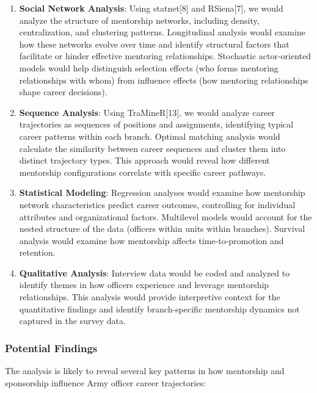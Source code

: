 \documentclass[
  letterpaper,
  DIV=11,
  numbers=noendperiod]{scrartcl}
\begin{document}
\begin{enumerate}
\def\labelenumi{\arabic{enumi}.}
\item
  \textbf{Social Network Analysis}: Using statnet{[}8{]} and
  RSiena{[}7{]}, we would analyze the structure of mentorship networks,
  including density, centralization, and clustering patterns.
  Longitudinal analysis would examine how these networks evolve over
  time and identify structural factors that facilitate or hinder
  effective mentoring relationships. Stochastic actor-oriented models
  would help distinguish selection effects (who forms mentoring
  relationships with whom) from influence effects (how mentoring
  relationships shape career decisions).
\item
  \textbf{Sequence Analysis}: Using TraMineR{[}13{]}, we would analyze
  career trajectories as sequences of positions and assignments,
  identifying typical career patterns within each branch. Optimal
  matching analysis would calculate the similarity between career
  sequences and cluster them into distinct trajectory types. This
  approach would reveal how different mentorship configurations
  correlate with specific career pathways.
\item
  \textbf{Statistical Modeling}: Regression analyses would examine how
  mentorship network characteristics predict career outcomes,
  controlling for individual attributes and organizational factors.
  Multilevel models would account for the nested structure of the data
  (officers within units within branches). Survival analysis would
  examine how mentorship affects time-to-promotion and retention.
\item
  \textbf{Qualitative Analysis}: Interview data would be coded and
  analyzed to identify themes in how officers experience and leverage
  mentorship relationships. This analysis would provide interpretive
  context for the quantitative findings and identify branch-specific
  mentorship dynamics not captured in the survey data.
\end{enumerate}

\subsubsection{Potential Findings}\label{potential-findings}

The analysis is likely to reveal several key patterns in how mentorship
and sponsorship influence Army officer career trajectories:
\end{document}
